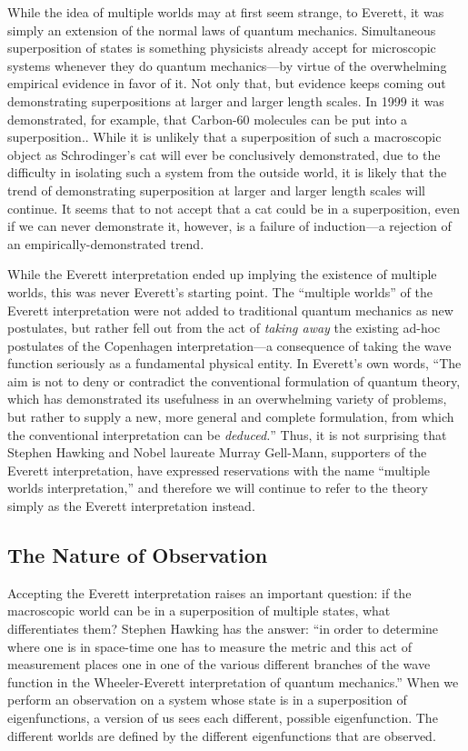 \documentclass[
    12pt,
    letterpaper,
    aps,
    prd,
    longbibliography,
    twocolumn,
    nofootinbib,
    raggedbottom,
    amsmath,
    amssymb,
    amsfonts,
]{revtex4-1}
\begin{document}
While the idea of multiple worlds may at first seem strange, to Everett, it was simply an extension of the normal laws of quantum mechanics. Simultaneous superposition of states is something physicists already accept for microscopic systems whenever they do quantum mechanics---by virtue of the overwhelming empirical evidence in favor of it. Not only that, but evidence keeps coming out demonstrating superpositions at larger and larger length scales. In 1999 it was demonstrated, for example, that Carbon-60 molecules can be put into a superposition.\cite{buckyballs}. While it is unlikely that a superposition of such a macroscopic object as Schrodinger's cat will ever be conclusively demonstrated, due to the difficulty in isolating such a system from the outside world, it is likely that the trend of demonstrating superposition at larger and larger length scales will continue. It seems that to not accept that a cat could be in a superposition, even if we can never demonstrate it, however, is a failure of induction---a rejection of an empirically-demonstrated trend.

While the Everett interpretation ended up implying the existence of multiple worlds, this was never Everett's starting point. The ``multiple worlds'' of the Everett interpretation were not added to traditional quantum mechanics as new postulates, but rather fell out from the act of \textit{taking away} the existing ad-hoc postulates of the Copenhagen interpretation---a consequence of taking the wave function seriously as a fundamental physical entity. In Everett's own words, ``The aim is not to deny or contradict the conventional formulation of quantum theory, which has demonstrated its usefulness in an overwhelming variety of problems, but rather to supply a new, more general and complete formulation, from which the conventional interpretation can be \textit{deduced.}''\cite{relativestate} Thus, it is not surprising that Stephen Hawking and Nobel laureate Murray Gell-Mann, supporters of the Everett interpretation, have expressed reservations with the name ``multiple worlds interpretation,'' and therefore we will continue to refer to the theory simply as the Everett interpretation instead.\cite{faq}

\subsection{The Nature of Observation}

Accepting the Everett interpretation raises an important question: if the macroscopic world can be in a superposition of multiple states, what differentiates them? Stephen Hawking has the answer: ``in order to determine where one is in space-time one has to measure the metric and this act of measurement places one in one of the various different branches of the wave function in the Wheeler-Everett interpretation of quantum mechanics.''\cite{hawking} When we perform an observation on a system whose state is in a superposition of eigenfunctions, a version of us sees each different, possible eigenfunction. The different worlds are defined by the different eigenfunctions that are observed.
\end{document}

